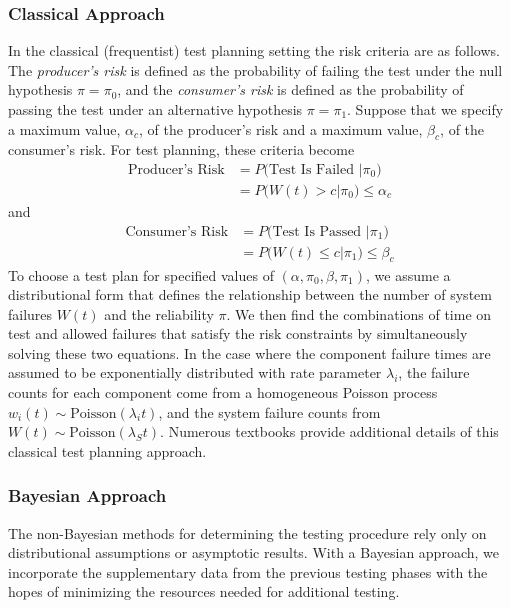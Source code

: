 \documentclass[12pt]{article}
\begin{document}
\subsubsection{Classical Approach}
In the classical (frequentist) test planning setting the risk criteria
are as follows. The \emph{producer's risk} is defined as the probability of
failing the test under the null hypothesis $\pi = \pi_0$, and the
\emph{consumer's risk} is defined as the probability of passing the test under an
alternative hypothesis $\pi = \pi_1$.  Suppose that we specify a maximum value,
$\alpha_c$, of the producer's risk and a maximum value, $\beta_c$, of the consumer's
risk. For test planning, these criteria become
$$
\begin{aligned}
	\text{Producer's Risk} &= P \text{(Test Is Failed } \vert \pi_0 \text{)} \\ &=
	P \text{(} W(t) > c \vert \pi_0 \text{)} \leq \alpha_c
\end{aligned}
$$
and
$$
\begin{aligned}
	\text{Consumer's Risk} &= P \text{(Test Is Passed } \vert \pi_1 \text{)} \\ &=
	P \text{(} W(t) \leq c \vert \pi_1 \text{)} \leq \beta_c
\end{aligned}
$$
To choose a test plan for specified values of $(\alpha, \pi_0, \beta, \pi_1)$,
we assume a distributional form that defines the relationship between the number
of system failures $W(t)$ and the reliability $\pi$.  We then find
the combinations of time on test and allowed failures that satisfy the risk constraints by simultaneously solving these two equations.  In the case where the component failure times are assumed to be exponentially distributed with rate parameter $\lambda_i$, the failure counts for
each component come from a homogeneous Poisson process $w_i(t) \sim
\text{Poisson}(\lambda_i t)$, and the system failure counts from $W(t) \sim
\text{Poisson}(\lambda_S t)$.  Numerous textbooks provide additional details of
this classical test planning approach. ~\cite{ref8}

\subsubsection{Bayesian Approach}
The non-Bayesian methods for determining the testing procedure rely only on distributional assumptions or asymptotic results. With a Bayesian approach, we
incorporate the supplementary data from the previous testing phases with the
hopes of minimizing the resources needed for additional testing.
\end{document}
